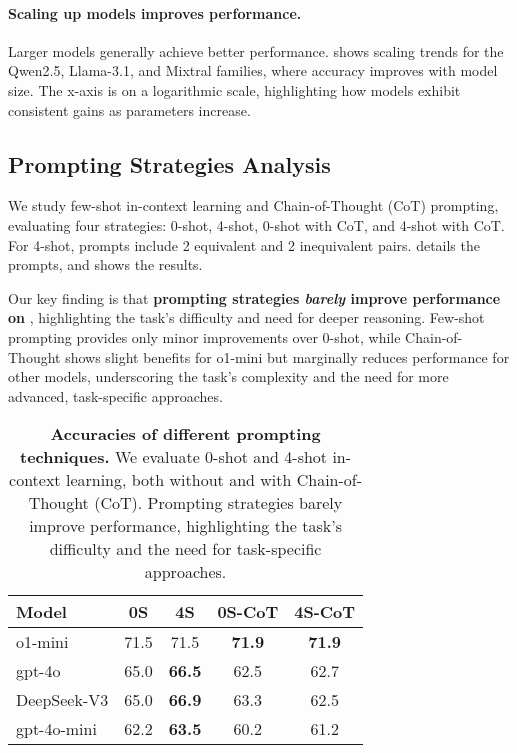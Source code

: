 \paragraph{Scaling up models improves performance.} Larger models generally achieve better performance.  shows scaling trends for the Qwen2.5, Llama-3.1, and Mixtral families, where accuracy improves with model size. The x-axis is on a logarithmic scale, highlighting how models exhibit consistent gains as parameters increase.


\subsection{Prompting Strategies Analysis}
\label{subsec:prompt}

We study few-shot in-context learning and Chain-of-Thought (CoT) prompting, evaluating four strategies: 0-shot, 4-shot, 0-shot with CoT, and 4-shot with CoT. For 4-shot, prompts include 2 equivalent and 2 inequivalent pairs.  details the prompts, and  shows the results.

Our key finding is that \textbf{prompting strategies \emph{barely} improve performance on \name}, highlighting the task's difficulty and need for deeper reasoning. Few-shot prompting provides only minor improvements over 0-shot, while Chain-of-Thought shows slight benefits for o1-mini but marginally reduces performance for other models, underscoring the task’s complexity and the need for more advanced, task-specific approaches.



\begin{table}[!tb]
\centering
\small
\begin{tabular}{lcccc}
\toprule
\textbf{Model} & \textbf{0S} & \textbf{4S} & \textbf{0S-CoT} & \textbf{4S-CoT} \\
\midrule
o1-mini & 71.5 & 71.5 & \textbf{71.9} & \textbf{71.9} \\
gpt-4o & 65.0 & \textbf{66.5} & 62.5 & 62.7 \\
DeepSeek-V3 & 65.0 & \textbf{66.9} & 63.3 & 62.5 \\
gpt-4o-mini & 62.2 & \textbf{63.5} & 60.2 & 61.2 \\
\bottomrule
\end{tabular}
\caption{\textbf{Accuracies of different prompting techniques.} We evaluate 0-shot and 4-shot in-context learning, both without and with Chain-of-Thought (CoT). Prompting strategies barely improve performance, highlighting the task’s difficulty and the need for task-specific approaches.}
\label{tab:prompt}
\end{table}

